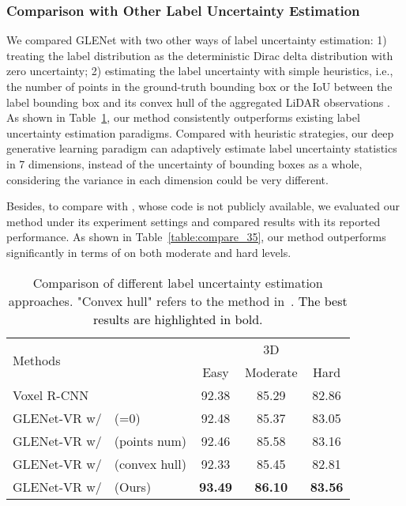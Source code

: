 \documentclass[twocolumn]{svjour3}
\newcommand{\revise}[1]{\textcolor{black}{#1}}
\begin{document}
\subsubsection{Comparison with Other Label Uncertainty Estimation} We compared GLENet with two other ways of label uncertainty estimation: 1) treating the label distribution as the deterministic Dirac delta distribution with zero uncertainty; 2) estimating the label uncertainty with simple heuristics, i.e., the number of points in the ground-truth bounding box or the IoU between the label bounding box and its convex hull of the aggregated LiDAR observations \citep{meyer2020learning}.
As shown in Table~\ref{table:label_generating}, our method consistently outperforms existing label uncertainty estimation paradigms. Compared with heuristic strategies, our deep generative learning paradigm can adaptively estimate label uncertainty statistics in 7 dimensions, instead of the uncertainty of bounding boxes as a whole, considering the variance in each dimension could be very different.


Besides, to compare with \citep{feng_iros}, whose code is not publicly available, we evaluated our method under its experiment settings and compared results with its reported performance.
As shown in Table~\ref{table:compare_35}, our method outperforms \citep{feng_iros} significantly in terms of  on both moderate and hard levels.

\setlength{\tabcolsep}{5pt}
\begin{table}[t]
\centering
\caption{Comparison of different label uncertainty estimation approaches. "Convex hull" refers to the method in~\citep{meyer2020learning}. \revise{The best results are highlighted in bold.}}
\label{table:label_generating}
\begin{tabular}{l|ccc} 
\toprule
\multirow{2}{*}{Methods}                    & \multicolumn{3}{c}{3D }  \\
                                           & Easy  & Moderate  & Hard                        \\ 
\hline
Voxel R-CNN                                   & 92.38 & 85.29    & 82.86                    \\
GLENet-VR w/~~(=0)           & 92.48 & 85.37    & 83.05                    \\
GLENet-VR w/~~(points num)             & 92.46 & 85.58    & 83.16                    \\
GLENet-VR w/~~(convex hull)   & 92.33 & 85.45    & 82.81                    \\
GLENet-VR w/~~(Ours)                   & \textbf{93.49} & \textbf{86.10}    & \textbf{83.56}                    \\
\bottomrule
\end{tabular}
\end{table}
\setlength{\tabcolsep}{1.5pt}
\end{document}
